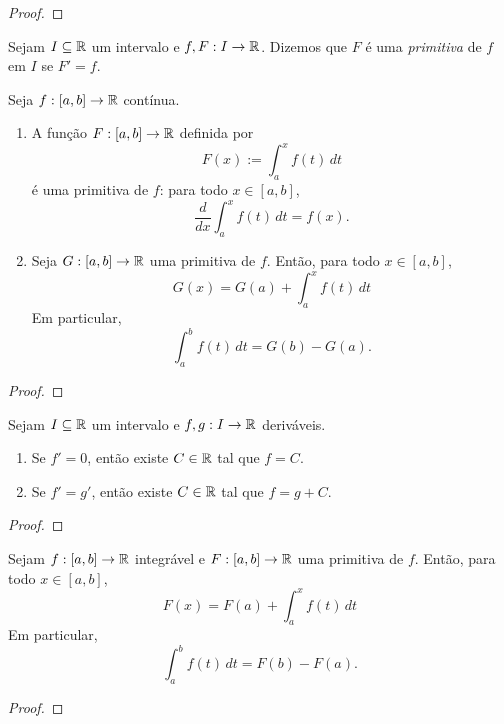 \begin{proof}
    \blackproof
\end{proof}

\begin{definition}
    Sejam $I \subseteq \mathbb{R}$ um intervalo e $f,F : I \to \mathbb{R}$. Dizemos que $F$ é uma \emph{primitiva} de $f$ em $I$ se $F' = f$.
\end{definition}

\begin{corollary}
    Seja $f : [a,b] \to \mathbb{R}$ contínua.
        \begin{enumerate}[leftmargin=*, align=left, label=\textbf{(\alph*)}]
            \item A função $F: [a,b] \to \mathbb{R}$ definida por
                \[
                    F(x) := \int_{a}^{x} f(t) \, dt
                \]
            é uma primitiva de $f$: para todo $x \in [a,b]$,
                \[
                    \dfrac{d}{dx} \int_{a}^{x} f(t) \, dt = f(x).
                \]
            \item Seja $G: [a,b] \to \mathbb{R}$ uma primitiva de $f$. Então, para todo $x \in [a,b]$,
                \[
                    G(x) = G(a) + \int_{a}^{x} f(t) \, dt
                \]
            Em particular,
                \[
                    \int_{a}^{b} f(t) \, dt = G(b) - G(a).
                \]
        \end{enumerate}
\end{corollary}

\begin{proof}
    \blackproof
\end{proof}

\begin{theorem}
    Sejam $I \subseteq \mathbb{R}$ um intervalo e $f , g : I \to \mathbb{R}$ deriváveis.
        \begin{enumerate}[leftmargin=*, align=left, label=\textbf{(\alph*)}]
            \item Se $f' = 0$, então existe $C \in \mathbb{R}$ tal que $f = C$.
            \item Se $f' = g'$, então existe $C \in \mathbb{R}$ tal que $f = g + C$.
        \end{enumerate}
\end{theorem}

\begin{proof}
    \blackproof
\end{proof}

\begin{theorem} \label{teo.calc1:TFC2}
    Sejam $f : [a,b] \to \mathbb{R}$ integrável e $F : [a,b] \to \mathbb{R}$ uma primitiva de $f$. Então, para todo $x \in [a,b]$,
        \[
            F(x) = F(a) + \int_{a}^{x} f(t) \, dt
        \]
    Em particular,
        \[
            \int_{a}^{b} f(t) \, dt = F(b) - F(a).
        \]
\end{theorem}

\begin{proof}
    \blackproof
\end{proof}